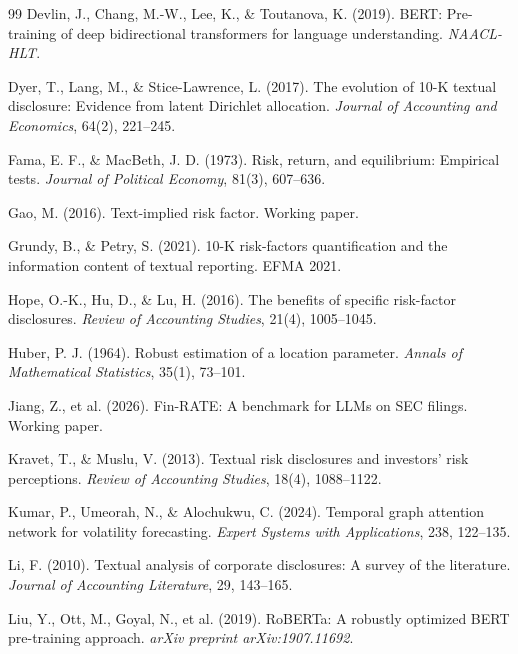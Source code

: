 \documentclass[11pt, a4paper]{article}
\begin{document}
\begin{thebibliography}{99}
     Devlin, J., Chang, M.-W., Lee, K., \& Toutanova, K. (2019). BERT: Pre-training of deep bidirectional transformers for language understanding. \textit{NAACL-HLT}.

     Dyer, T., Lang, M., \& Stice-Lawrence, L. (2017). The evolution of 10-K textual disclosure: Evidence from latent Dirichlet allocation. \textit{Journal of Accounting and Economics}, 64(2), 221--245.

     Fama, E. F., \& MacBeth, J. D. (1973). Risk, return, and equilibrium: Empirical tests. \textit{Journal of Political Economy}, 81(3), 607--636.

     Gao, M. (2016). Text-implied risk factor. Working paper.

     Grundy, B., \& Petry, S. (2021). 10-K risk-factors quantification and the information content of textual reporting. EFMA 2021.

     Hope, O.-K., Hu, D., \& Lu, H. (2016). The benefits of specific risk-factor disclosures. \textit{Review of Accounting Studies}, 21(4), 1005--1045.

     Huber, P. J. (1964). Robust estimation of a location parameter. \textit{Annals of Mathematical Statistics}, 35(1), 73--101.

     Jiang, Z., et al. (2026). Fin-RATE: A benchmark for LLMs on SEC filings. Working paper.

     Kravet, T., \& Muslu, V. (2013). Textual risk disclosures and investors' risk perceptions. \textit{Review of Accounting Studies}, 18(4), 1088--1122.

     Kumar, P., Umeorah, N., \& Alochukwu, C. (2024). Temporal graph attention network for volatility forecasting. \textit{Expert Systems with Applications}, 238, 122--135.

     Li, F. (2010). Textual analysis of corporate disclosures: A survey of the literature. \textit{Journal of Accounting Literature}, 29, 143--165.

     Liu, Y., Ott, M., Goyal, N., et al. (2019). RoBERTa: A robustly optimized BERT pre-training approach. \textit{arXiv preprint arXiv:1907.11692}.


\end{thebibliography}
\end{document}
